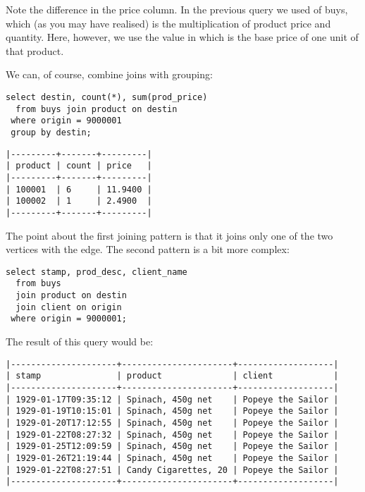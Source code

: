 Note the difference in the price column.
In the previous query we used  of buys,
which (as you may have realised)
is the multiplication of product price and quantity.
Here, however, we use the value in 
which is the base price of one unit of that product.

We can, of course, combine joins with grouping:

\begin{sqlcode}
\begin{lstlisting}
select destin, count(*), sum(prod_price)
  from buys join product on destin
 where origin = 9000001
 group by destin;
\end{lstlisting}
\end{sqlcode}

\begin{minipage}{\textwidth}
\begin{verbatim}
|---------+-------+---------|
| product | count | price   |
|---------+-------+---------|
| 100001  | 6     | 11.9400 |
| 100002  | 1     | 2.4900  |
|---------+-------+---------|
\end{verbatim}
\end{minipage}

The point about the first joining pattern
is that it joins only one of the two vertices
with the edge. The second pattern is a bit more complex:

\begin{sqlcode}
\begin{lstlisting}
select stamp, prod_desc, client_name
  from buys
  join product on destin
  join client on origin
 where origin = 9000001;
\end{lstlisting}
\end{sqlcode}

The result of this query would be:

\begin{minipage}{\textwidth}
\begin{verbatim}
|---------------------+----------------------+-------------------|
| stamp               | product              | client            |
|---------------------+----------------------+-------------------|
| 1929-01-17T09:35:12 | Spinach, 450g net    | Popeye the Sailor |
| 1929-01-19T10:15:01 | Spinach, 450g net    | Popeye the Sailor |
| 1929-01-20T17:12:55 | Spinach, 450g net    | Popeye the Sailor |
| 1929-01-22T08:27:32 | Spinach, 450g net    | Popeye the Sailor |
| 1929-01-25T12:09:59 | Spinach, 450g net    | Popeye the Sailor |
| 1929-01-26T21:19:44 | Spinach, 450g net    | Popeye the Sailor |
| 1929-01-22T08:27:51 | Candy Cigarettes, 20 | Popeye the Sailor |
|---------------------+----------------------+-------------------|
\end{verbatim}
\end{minipage}

